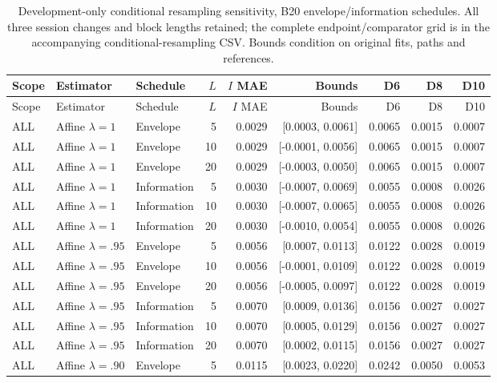 \small\setlength{\tabcolsep}{4pt}
\begin{longtable}{lllrrrrrr}
\caption{Development-only conditional resampling sensitivity, B20 envelope/information schedules. All three session changes and block lengths retained; the complete endpoint/comparator grid is in the accompanying conditional-resampling CSV. Bounds condition on original fits, paths and references.}\label{tab:s_resampling}\\
\toprule
Scope & Estimator & Schedule & $L$ & $I$ MAE & Bounds & D6 & D8 & D10 \\ \midrule\endfirsthead
\toprule
Scope & Estimator & Schedule & $L$ & $I$ MAE & Bounds & D6 & D8 & D10 \\ \midrule\endhead
\bottomrule\endfoot
ALL & Affine $\lambda=1$ & Envelope & 5 & 0.0029 & [0.0003, 0.0061] & 0.0065 & 0.0015 & 0.0007 \\
ALL & Affine $\lambda=1$ & Envelope & 10 & 0.0029 & [-0.0001, 0.0056] & 0.0065 & 0.0015 & 0.0007 \\
ALL & Affine $\lambda=1$ & Envelope & 20 & 0.0029 & [-0.0003, 0.0050] & 0.0065 & 0.0015 & 0.0007 \\
ALL & Affine $\lambda=1$ & Information & 5 & 0.0030 & [-0.0007, 0.0069] & 0.0055 & 0.0008 & 0.0026 \\
ALL & Affine $\lambda=1$ & Information & 10 & 0.0030 & [-0.0007, 0.0065] & 0.0055 & 0.0008 & 0.0026 \\
ALL & Affine $\lambda=1$ & Information & 20 & 0.0030 & [-0.0010, 0.0054] & 0.0055 & 0.0008 & 0.0026 \\
ALL & Affine $\lambda=.95$ & Envelope & 5 & 0.0056 & [0.0007, 0.0113] & 0.0122 & 0.0028 & 0.0019 \\
ALL & Affine $\lambda=.95$ & Envelope & 10 & 0.0056 & [-0.0001, 0.0109] & 0.0122 & 0.0028 & 0.0019 \\
ALL & Affine $\lambda=.95$ & Envelope & 20 & 0.0056 & [-0.0005, 0.0097] & 0.0122 & 0.0028 & 0.0019 \\
ALL & Affine $\lambda=.95$ & Information & 5 & 0.0070 & [0.0009, 0.0136] & 0.0156 & 0.0027 & 0.0027 \\
ALL & Affine $\lambda=.95$ & Information & 10 & 0.0070 & [0.0005, 0.0129] & 0.0156 & 0.0027 & 0.0027 \\
ALL & Affine $\lambda=.95$ & Information & 20 & 0.0070 & [0.0002, 0.0115] & 0.0156 & 0.0027 & 0.0027 \\
ALL & Affine $\lambda=.90$ & Envelope & 5 & 0.0115 & [0.0023, 0.0220] & 0.0242 & 0.0050 & 0.0053 \\

\end{longtable}
